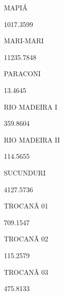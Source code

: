 \documentclass[
  letterpaper,
]{report}
\begin{document}
MAPIÁ

\n      

1017.3599

\n    

\n    

\n      

MARI-MARI

\n      

11235.7848

\n    

\n    

\n      

PARACONI

\n      

13.4645

\n    

\n    

\n      

RIO MADEIRA I

\n      

359.8604

\n    

\n    

\n      

RIO MADEIRA II

\n      

114.5655

\n    

\n    

\n      

SUCUNDURI

\n      

4127.5736

\n    

\n    

\n      

TROCANÃ 01

\n      

709.1547

\n    

\n    

\n      

TROCANÃ 02

\n      

115.2579

\n    

\n    

\n      

TROCANÃ 03

\n      

475.8133

\n    

\n    
\end{document}
